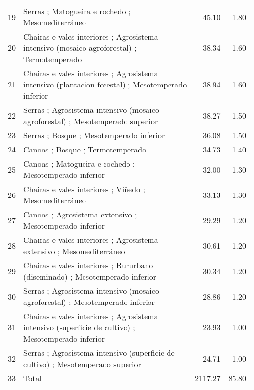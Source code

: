 \begin{table}[p]
\begin{tabular}{rlrr}
  19 & Serras ; Matogueira e rochedo ; Mesomediterráneo & 45.10 & 1.80 \\ 
  20 & Chairas e vales interiores ; Agrosistema intensivo (mosaico agroforestal) ; Termotemperado & 38.34 & 1.60 \\ 
  21 & Chairas e vales interiores ; Agrosistema intensivo (plantacion forestal) ; Mesotemperado inferior & 38.94 & 1.60 \\ 
  22 & Serras ; Agrosistema intensivo (mosaico agroforestal) ; Mesotemperado superior & 38.27 & 1.50 \\ 
  23 & Serras ; Bosque ; Mesotemperado inferior & 36.08 & 1.50 \\ 
  24 & Canons ; Bosque ; Termotemperado & 34.73 & 1.40 \\ 
  25 & Canons ; Matogueira e rochedo ; Mesotemperado inferior & 32.00 & 1.30 \\ 
  26 & Chairas e vales interiores ; Viñedo ; Mesomediterráneo & 33.13 & 1.30 \\ 
  27 & Canons ; Agrosistema extensivo ; Mesotemperado inferior & 29.29 & 1.20 \\ 
  28 & Chairas e vales interiores ; Agrosistema extensivo ; Mesomediterráneo & 30.61 & 1.20 \\ 
  29 & Chairas e vales interiores ; Rururbano (diseminado) ; Mesotemperado inferior & 30.34 & 1.20 \\ 
  30 & Serras ; Agrosistema intensivo (mosaico agroforestal) ; Mesotemperado inferior & 28.86 & 1.20 \\ 
  31 & Chairas e vales interiores ; Agrosistema intensivo (superficie de cultivo) ; Mesotemperado inferior & 23.93 & 1.00 \\ 
  32 & Serras ; Agrosistema intensivo (superficie de cultivo) ; Mesotemperado superior & 24.71 & 1.00 \\ 
  33 & Total & 2117.27 & 85.80 \\ 
   \hline
\end{tabular}
\end{table}
